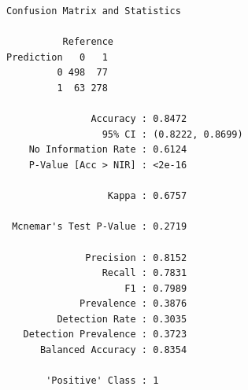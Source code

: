 \documentclass[
  letterpaper,
  DIV=11,
  numbers=noendperiod]{scrartcl}
\newenvironment{Shaded}{\begin{snugshade}}{\end{snugshade}}
\newcommand{\AttributeTok}[1]{\textcolor[rgb]{0.40,0.45,0.13}{#1}}
\newcommand{\FunctionTok}[1]{\textcolor[rgb]{0.28,0.35,0.67}{#1}}
\newcommand{\NormalTok}[1]{\textcolor[rgb]{0.00,0.23,0.31}{#1}}
\newcommand{\OtherTok}[1]{\textcolor[rgb]{0.00,0.23,0.31}{#1}}
\newcommand{\SpecialCharTok}[1]{\textcolor[rgb]{0.37,0.37,0.37}{#1}}
\newcommand{\StringTok}[1]{\textcolor[rgb]{0.13,0.47,0.30}{#1}}
\begin{document}
\begin{verbatim}
Confusion Matrix and Statistics

          Reference
Prediction   0   1
         0 498  77
         1  63 278
                                          
               Accuracy : 0.8472          
                 95% CI : (0.8222, 0.8699)
    No Information Rate : 0.6124          
    P-Value [Acc > NIR] : <2e-16          
                                          
                  Kappa : 0.6757          
                                          
 Mcnemar's Test P-Value : 0.2719          
                                          
              Precision : 0.8152          
                 Recall : 0.7831          
                     F1 : 0.7989          
             Prevalence : 0.3876          
         Detection Rate : 0.3035          
   Detection Prevalence : 0.3723          
      Balanced Accuracy : 0.8354          
                                          
       'Positive' Class : 1               
                                          
\end{verbatim}

\begin{Shaded}
\end{Shaded}
\end{document}
